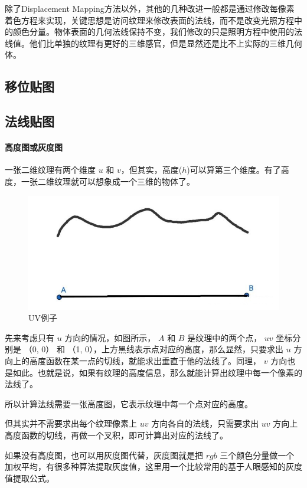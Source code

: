 \documentclass[UTF8,a4paper,12pt]{ctexbook}
\begin{document}
		除了Displacement Mapping方法以外，其他的几种改进一般都是通过修改每像素着色方程来实现，关键思想是访问纹理来修改表面的法线，而不是改变光照方程中的颜色分量。物体表面的几何法线保持不变，我们修改的只是照明方程中使用的法线值。他们比单独的纹理有更好的三维感官，但是显然还是比不上实际的三维几何体。
		
		\subsection{移位贴图}
		
		\subsection{法线贴图}
			\paragraph{高度图或灰度图}
				一张二维纹理有两个维度 $u$ 和 $v$，但其实，高度($h$)可以算第三个维度。有了高度，一张二维纹理就可以想象成一个三维的物体了。
					\begin{figure}[H]
						\centering
						\includegraphics[scale=0.54]{norMap}
						\caption{UV例子}
					\end{figure}
				
				先来考虑只有 $u$ 方向的情况，如图所示， $A$ 和 $B$ 是纹理中的两个点， $uv$ 坐标分别是 （0, 0） 和 （1, 0），上方黑线表示点对应的高度，那么显然，只要求出 $u$ 方向上的高度函数在某一点的切线，就能求出垂直于他的法线了。同理， $v$ 方向也是如此。也就是说，如果有纹理的高度信息，那么就能计算出纹理中每一个像素的法线了。
				
				所以计算法线需要一张高度图，它表示纹理中每一个点对应的高度。
				
				但其实并不需要求出每个纹理像素上 $uv$ 方向各自的法线，只需要求出 $uv$ 方向上高度函数的切线，再做一个叉积，即可计算出对应的法线了。
				
				如果没有高度图，也可以用灰度图代替，灰度图就是把 $rgb$ 三个颜色分量做一个加权平均，有很多种算法提取灰度值，这里用一个比较常用的基于人眼感知的灰度值提取公式。
				
\end{document}
